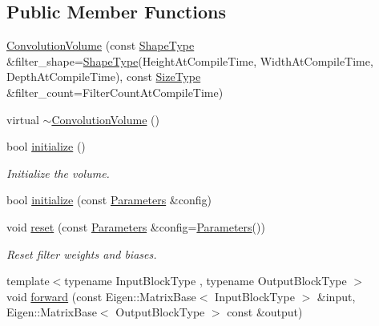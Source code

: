 \subsection*{Public Member Functions}
\begin{DoxyCompactItemize}
\item 
\hyperlink{classffnn_1_1layer_1_1_convolution_volume_a336589a1c11fe8a21477f553d72a8e24}{Convolution\-Volume} (const \hyperlink{classffnn_1_1layer_1_1_convolution_volume_abd66a08414e0b2892f30f4afd32f7e30}{Shape\-Type} \&filter\-\_\-shape=\hyperlink{classffnn_1_1layer_1_1_convolution_volume_abd66a08414e0b2892f30f4afd32f7e30}{Shape\-Type}(Height\-At\-Compile\-Time, Width\-At\-Compile\-Time, Depth\-At\-Compile\-Time), const \hyperlink{classffnn_1_1layer_1_1_convolution_volume_a1ca8d2a6071885cf033b006b8a514452}{Size\-Type} \&filter\-\_\-count=Filter\-Count\-At\-Compile\-Time)
\item 
virtual \hyperlink{classffnn_1_1layer_1_1_convolution_volume_ace4d422cfdc0ff354e93402598a6f80f}{$\sim$\-Convolution\-Volume} ()
\item 
bool \hyperlink{classffnn_1_1layer_1_1_convolution_volume_aff627131f0cd431b30ee95686c7c317e}{initialize} ()
\begin{DoxyCompactList}\small\item\em Initialize the volume. \end{DoxyCompactList}\item 
bool \hyperlink{classffnn_1_1layer_1_1_convolution_volume_adb7d02e4af5423e001a4ac9008d97e5b}{initialize} (const \hyperlink{structffnn_1_1layer_1_1_convolution_volume_1_1_parameters}{Parameters} \&config)
\item 
void \hyperlink{classffnn_1_1layer_1_1_convolution_volume_aa1c48e5b7965733f5b2a5a14e5e40ce4}{reset} (const \hyperlink{structffnn_1_1layer_1_1_convolution_volume_1_1_parameters}{Parameters} \&config=\hyperlink{structffnn_1_1layer_1_1_convolution_volume_1_1_parameters}{Parameters}())
\begin{DoxyCompactList}\small\item\em Reset filter weights and biases. \end{DoxyCompactList}\item 
{\footnotesize template$<$typename Input\-Block\-Type , typename Output\-Block\-Type $>$ }\\void \hyperlink{classffnn_1_1layer_1_1_convolution_volume_ac3b93a3af3fe20ae13bc23424e87dd08}{forward} (const Eigen\-::\-Matrix\-Base$<$ Input\-Block\-Type $>$ \&input, Eigen\-::\-Matrix\-Base$<$ Output\-Block\-Type $>$ const \&output)

\end{DoxyCompactItemize}
